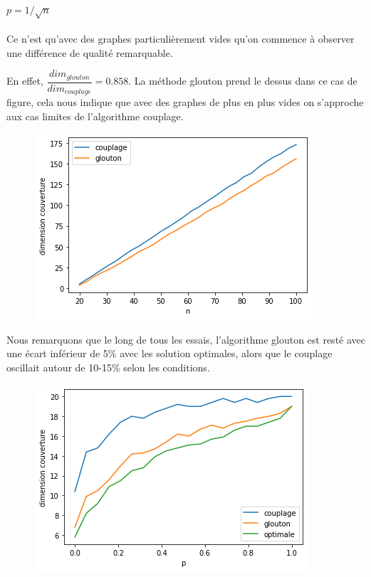 \documentclass[12pt]{article}
\begin{document}
\begin{enumerate}
                \paragraph{$p = 1/ \sqrt{n}$}
                    Ce n'est qu'avec des graphes particulièrement vides qu'on commence à observer une différence de qualité remarquable.

                    
                    En effet, $\dfrac{dim_{glouton}}{dim_{couplage}} = 0.858 $.
                    La méthode glouton prend le dessus dans ce cas de figure, cela nous indique que avec des graphes de plus en plus vides on s'approche aux cas limites de l'algorithme couplage.
                    \begin{figure}[H]
                        \includegraphics[scale=0.5]{figures/qualite_p.png}
                        \centering
                    \end{figure}


                Nous remarquons que le long de tous les essais, l'algorithme glouton est resté avec une écart inférieur de 5\% avec les solution optimales, alors que le couplage oscillait autour de 10-15\% selon les conditions.

                \begin{figure}[H]
                    \includegraphics[scale=0.5]{figures/qualite_pvar.png}
                    \centering
                \end{figure}
                

\end{enumerate}
\end{document}
